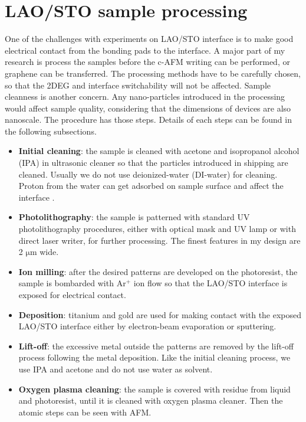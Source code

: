 \documentclass[pdftex, sectionletters]{pittetd}    %
\begin{document}
\section{LAO/STO sample processing}

One of the challenges with experiments on LAO/STO interface is to make good electrical contact from the bonding pads to the interface. A major part of my research is process the samples before the c-AFM writing can be performed, or graphene can be transferred. The processing methods have to be carefully chosen, so that the 2DEG and interface switchability will not be affected. Sample cleanness is another concern. Any nano-particles introduced in the processing would affect sample quality, considering that the dimensions of devices are also nanoscale. The procedure has those steps. Details of each steps can be found in the following subsections.

\begin{itemize}
	
	\item \textbf{Initial cleaning}: the sample is cleaned with acetone and isopropanol alcohol (IPA) in ultrasonic cleaner so that the particles introduced in shipping are cleaned. Usually we do not use deionized-water (DI-water) for cleaning. Proton from the water can get adsorbed on sample surface and affect the interface \cite{}.
	
	\item \textbf{Photolithography}: the sample is patterned with standard UV photolithography procedures, either with optical mask and UV lamp or with direct laser writer, for further processing. The finest features in my design are 2 $\mathrm{\mu}$m wide.
	
	\item \textbf{Ion milling}: after the desired patterns are developed on the photoresist, the sample is bombarded with Ar$^+$ ion flow so that the LAO/STO interface is exposed for electrical contact.
	
	\item \textbf{Deposition}: titanium and gold are used for making contact with the exposed LAO/STO interface either by electron-beam evaporation or sputtering.
	
	\item \textbf{Lift-off}: the excessive metal outside the patterns are removed by the lift-off process following the metal deposition. Like the initial cleaning process, we use IPA and acetone and do not use water as solvent.
	
	\item \textbf{Oxygen plasma cleaning}: the sample is covered with residue from liquid and photoresist, until it is cleaned with oxygen plasma cleaner. Then the atomic steps can be seen with AFM.
	
\end{itemize}
	
\end{document}
